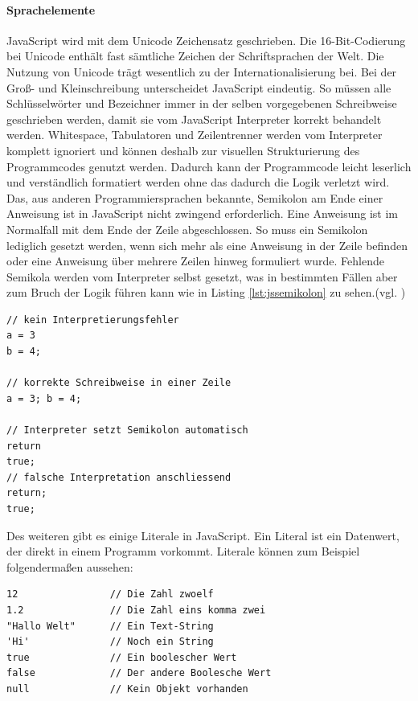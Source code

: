 \documentclass[12pt,a4paper,bibliography=totocnumbered,listof=totocnumbered]{scrartcl}
\begin{document}
\paragraph{Sprachelemente} JavaScript wird mit dem Unicode Zeichensatz geschrieben. Die 16-Bit-Codierung bei Unicode enthält fast sämtliche Zeichen der Schriftsprachen der Welt. Die Nutzung von Unicode trägt wesentlich zu der Internationalisierung bei. Bei der Groß- und Kleinschreibung unterscheidet JavaScript eindeutig. So müssen alle Schlüsselwörter und Bezeichner immer in der selben vorgegebenen Schreibweise geschrieben werden, damit sie vom JavaScript Interpreter korrekt behandelt werden. Whitespace, Tabulatoren und Zeilentrenner werden vom Interpreter komplett ignoriert und können deshalb zur visuellen Strukturierung des Programmcodes genutzt werden. Dadurch kann der Programmcode leicht leserlich und verständlich formatiert werden ohne das dadurch die Logik verletzt wird. Das, aus anderen Programmiersprachen bekannte, Semikolon am Ende einer Anweisung ist in JavaScript nicht zwingend erforderlich. Eine Anweisung ist im Normalfall mit dem Ende der Zeile abgeschlossen. So muss ein Semikolon lediglich gesetzt werden, wenn sich mehr als eine Anweisung in der Zeile befinden oder eine Anweisung über mehrere Zeilen hinweg formuliert wurde. Fehlende Semikola werden vom Interpreter selbst gesetzt, was in bestimmten Fällen aber zum Bruch der Logik führen kann wie in Listing \ref{lst:jssemikolon} zu sehen.(vgl. \cite[S.15ff]{FlanJava2007})

	\vspace{1em}
	\begin{lstlisting}[caption=JavaScript Logikbruch Semikolon, label=lst:jssemikolon]
// kein Interpretierungsfehler
a = 3
b = 4;

// korrekte Schreibweise in einer Zeile
a = 3; b = 4;

// Interpreter setzt Semikolon automatisch
return
true;
// falsche Interpretation anschliessend
return;
true;
	\end{lstlisting}

Des weiteren gibt es einige Literale in JavaScript. \glqq Ein Literal ist ein Datenwert, der direkt in einem Programm vorkommt. Literale können zum Beispiel folgendermaßen aussehen:\grqq{}\cite[S.18]{FlanJava2007}

	\vspace{1em}
	\begin{lstlisting}[caption=JavaScript Literale, label=lst:jsliterale]
12                // Die Zahl zwoelf
1.2               // Die Zahl eins komma zwei
"Hallo Welt"      // Ein Text-String
'Hi'              // Noch ein String
true              // Ein boolescher Wert
false             // Der andere Boolesche Wert
null              // Kein Objekt vorhanden
	\end{lstlisting}
	
\end{document}
